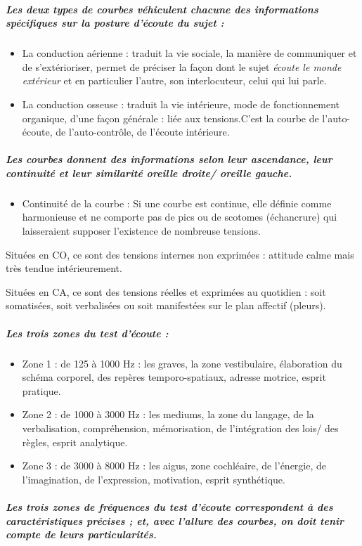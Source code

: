 \subparagraph{Les deux types de courbes véhiculent chacune des informations spécifiques
sur la posture d'écoute du sujet : }
\begin{itemize}
\item La conduction aérienne : traduit la vie sociale, la manière de communiquer
et de s'extérioriser, permet de préciser la façon dont le sujet\emph{
écoute le monde extérieur} et en particulier l\textquoteright autre,
son interlocuteur, celui qui lui parle. 
\item La conduction osseuse : traduit la vie intérieure, mode de fonctionnement
organique, d'une façon générale : liée aux tensions.C'est la courbe
de l\textquoteright auto-écoute, de l\textquoteright auto-contrôle,
de l'écoute intérieure.
\end{itemize}

\subparagraph{Les courbes donnent des informations selon leur ascendance, leur
continuité et leur similarité oreille droite/ oreille gauche.}
\begin{itemize}
\item Continuité de la courbe : Si une courbe est continue, elle définie
comme harmonieuse et ne comporte pas de pics ou de scotomes (échancrure)  qui laisseraient
supposer l'existence de nombreuse tensions.
\end{itemize}
Situées en CO, ce sont des tensions internes non exprimées : attitude
calme mais très tendue intérieurement.

Situées en CA, ce sont des tensions réelles et exprimées au quotidien
: soit somatisées, soit verbalisées ou soit manifestées sur le plan
affectif (pleurs).

\subparagraph{Les trois zones du test d'écoute : }
\begin{itemize}
\item Zone 1 : de 125 à 1000 Hz : les graves, la zone vestibulaire, élaboration
du schéma corporel, des repères temporo-spatiaux, adresse motrice,
esprit pratique.
\item Zone 2 : de 1000 à 3000 Hz : les mediums, la zone du langage, de la
verbalisation, compréhension, mémorisation, de l'intégration des lois/
des règles, esprit analytique.
\item Zone 3 : de 3000 à 8000 Hz : les aigus, zone cochléaire, de l'énergie,
de l'imagination, de l'expression, motivation, esprit synthétique.
\end{itemize}

\subparagraph{Les trois zones de fréquences du test d'écoute correspondent à des
caractéristiques précises ; et, avec l'allure des courbes, on doit
tenir compte de leurs particularités.}

